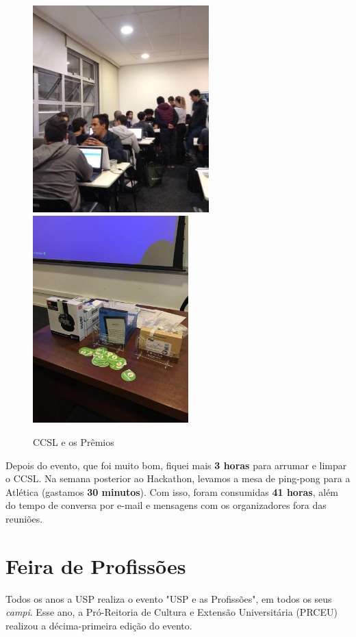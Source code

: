 \documentclass[12pt,letterpaper]{article}
\begin{document}
	\begin{figure}
		\begin{center}
			\includegraphics[height=8cm]{hack.jpg}  
			\includegraphics[height=8cm]{premio.jpg}
			\caption{CCSL e os Prêmios} 
		\end{center}
	\end{figure}	 
	
	Depois do evento, que foi muito bom, fiquei mais \textbf{3 horas} para arrumar e limpar o CCSL. Na semana posterior ao Hackathon, levamos a mesa de ping-pong para a Atlética (gastamos \textbf{30 minutos}). Com isso, foram consumidas \textbf{41 horas}, além do tempo de conversa por e-mail e mensagens com os organizadores fora das reuniões. 
	
	\section{Feira de Profissões}
	
	Todos os anos a USP realiza o evento "USP e as Profissões", em todos os seus \textit{campi}. Esse ano, a Pró-Reitoria de Cultura e Extensão Universitária (PRCEU) realizou a décima-primeira edição do evento.
	
\end{document}
